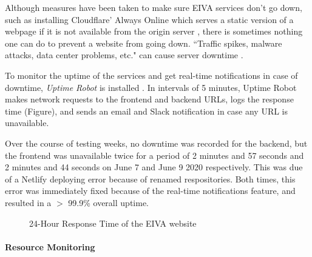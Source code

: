 \documentclass{article}
\begin{document}
Although measures have been taken to make sure EIVA services don't go down, such as installing Cloudflare' Always Online which serves a static version of a webpage if it is not available from the origin server \cite{noauthor_keep_nodate}, there is sometimes nothing one can do to prevent a website from going down. ``Traffic spikes, malware attacks, data center problems, etc." can cause server downtime \cite{noauthor_what_2018}.

To monitor the uptime of the services and get real-time notifications in case of downtime, \emph{Uptime Robot} is installed \cite{noauthor_about_nodate}. In intervals of 5 minutes, Uptime Robot makes network requests to the frontend and backend URLs, logs the response time (Figure), and sends an email and Slack notification in case any URL is unavailable.

Over the course of testing weeks, no downtime was recorded for the backend, but the frontend was unavailable twice for a period of 2 minutes and 57 seconds and 2 minutes and 44 seconds on June 7 and June 9 2020 respectively. This was due of a Netlify deploying error because of renamed respositories. Both times, this error was immediately fixed because of the real-time notifications feature, and resulted in a $>$ 99.9\% overall uptime.

\begin{figure}
\centering
{}
\caption{24-Hour Response Time of the EIVA website}
\end{figure}

\paragraph{Resource Monitoring}
\end{document}
